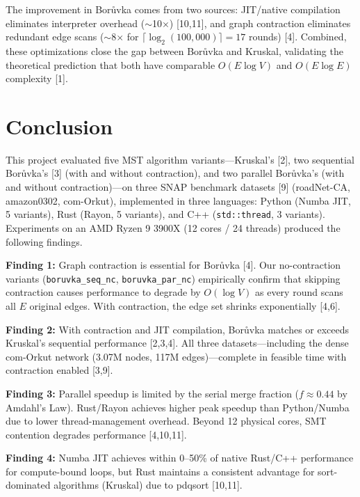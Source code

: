 \documentclass[12pt, a4paper]{article}
\begin{document}
The improvement in Bor\r{u}vka comes from two sources: JIT/native compilation eliminates interpreter overhead ($\sim$10$\times$) [10,11], and graph contraction eliminates redundant edge scans ($\sim$8$\times$ for $\lceil\log_2(100{,}000)\rceil = 17$ rounds) [4]. Combined, these optimizations close the gap between Bor\r{u}vka and Kruskal, validating the theoretical prediction that both have comparable $O(E \log V)$ and $O(E \log E)$ complexity [1].

\section{Conclusion}

This project evaluated five MST algorithm variants---Kruskal's [2], two sequential Bor\r{u}vka's [3] (with and without contraction), and two parallel Bor\r{u}vka's (with and without contraction)---on three SNAP benchmark datasets [9] (roadNet-CA, amazon0302, com-Orkut), implemented in three languages: Python (Numba JIT, 5 variants), Rust (Rayon, 5 variants), and C++ (\texttt{std::thread}, 3 variants). Experiments on an AMD Ryzen 9 3900X (12 cores / 24 threads) produced the following findings.

\textbf{Finding 1:} Graph contraction is essential for Bor\r{u}vka [4]. Our no-contraction variants (\texttt{boruvka\_seq\_nc}, \texttt{boruvka\_par\_nc}) empirically confirm that skipping contraction causes performance to degrade by $O(\log V)$ as every round scans all $E$ original edges. With contraction, the edge set shrinks exponentially [4,6].

\textbf{Finding 2:} With contraction and JIT compilation, Bor\r{u}vka matches or exceeds Kruskal's sequential performance [2,3,4]. All three datasets---including the dense com-Orkut network (3.07M nodes, 117M edges)---complete in feasible time with contraction enabled [3,9].

\textbf{Finding 3:} Parallel speedup is limited by the serial merge fraction ($f \approx 0.44$ by Amdahl's Law). Rust/Rayon achieves higher peak speedup than Python/Numba due to lower thread-management overhead. Beyond 12 physical cores, SMT contention degrades performance [4,10,11].

\textbf{Finding 4:} Numba JIT achieves within 0--50\% of native Rust/C++ performance for compute-bound loops, but Rust maintains a consistent advantage for sort-dominated algorithms (Kruskal) due to pdqsort [10,11].
\end{document}

